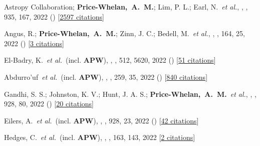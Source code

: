 {\item[{\color{deemph}\scriptsize104}]Astropy Collaboration; \textbf{Price-Whelan,~A.~M.}; Lim, P. L.; Earl, N.~\textit{et al.}, , \apj, 935, 167, 2022 () [\href{http://adsabs.harvard.edu/abs/2022ApJ...935..167A}{2597 citations}]

\item[{\color{deemph}\scriptsize103}]Angus, R.; \textbf{Price-Whelan,~A.~M.}; Zinn, J. C.; Bedell, M.~\textit{et al.}, , \aj, 164, 25, 2022 () [\href{http://adsabs.harvard.edu/abs/2022AJ....164...25A}{3 citations}]

\item[{\color{deemph}\scriptsize102}]El-Badry, K.~\textit{et al.}~(incl. \textbf{APW}), , \mnras, 512, 5620, 2022 () [\href{http://adsabs.harvard.edu/abs/2022MNRAS.512.5620E}{51 citations}]

\item[{\color{deemph}\scriptsize101}]Abdurro'uf~\textit{et al.}~(incl. \textbf{APW}), , \apjs, 259, 35, 2022 () [\href{http://adsabs.harvard.edu/abs/2022ApJS..259...35A}{840 citations}]

\item[{\color{deemph}\scriptsize100}]Gandhi, S. S.; Johnston, K. V.; Hunt, J. A. S.; \textbf{Price-Whelan,~A.~M.}~\textit{et al.}, , \apj, 928, 80, 2022 () [\href{http://adsabs.harvard.edu/abs/2022ApJ...928...80G}{20 citations}]

\item[{\color{deemph}\scriptsize99}]Eilers, A.~\textit{et al.}~(incl. \textbf{APW}), , \apj, 928, 23, 2022 () [\href{http://adsabs.harvard.edu/abs/2022ApJ...928...23E}{42 citations}]

\item[{\color{deemph}\scriptsize98}]Hedges, C.~\textit{et al.}~(incl. \textbf{APW}), , \aj, 163, 143, 2022 [\href{http://adsabs.harvard.edu/abs/2022AJ....163..143H}{2 citations}]

}

